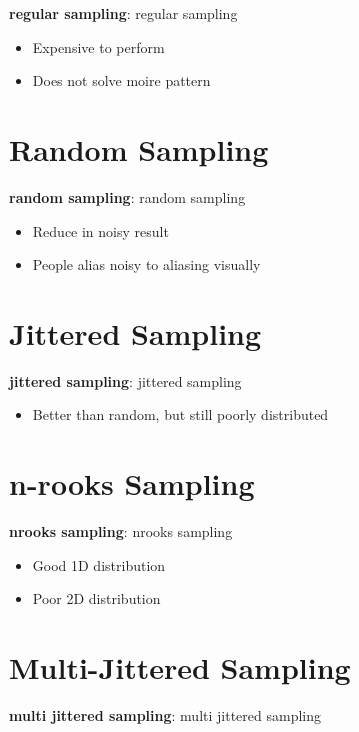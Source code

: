   \textbf{\Gls{regular sampling}}: \glsdesc{regular sampling}

  \begin{itemize}
    \item Expensive to perform
    \item Does not solve moire pattern
  \end{itemize}

\section{Random Sampling}

  \textbf{\Gls{random sampling}}: \glsdesc{random sampling}

  \begin{itemize}
    \item Reduce in noisy result
    \item People alias noisy to aliasing visually
  \end{itemize}

\section{Jittered Sampling}

  \textbf{\Gls{jittered sampling}}: \glsdesc{jittered sampling}

  \begin{itemize}
    \item Better than random, but still poorly distributed
  \end{itemize}

\section{n-rooks Sampling}

  \textbf{\Gls{nrooks sampling}}: \glsdesc{nrooks sampling}

  \begin{itemize}
    \item Good 1D distribution
    \item Poor 2D distribution
  \end{itemize}

\section{Multi-Jittered Sampling}

  \textbf{\Gls{multi jittered sampling}}: \glsdesc{multi jittered sampling}

